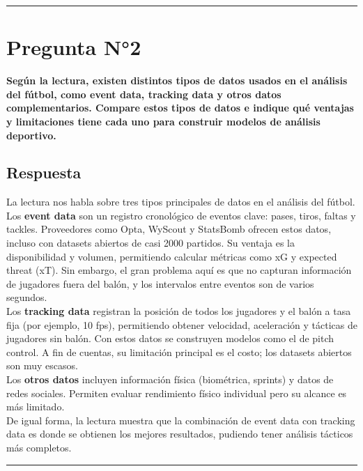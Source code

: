 \documentclass[12pt,a4paper]{article}
\begin{document}
\vspace{0.5cm}
\hrule
\vspace{0.5cm}

\section*{Pregunta N°2}
\textbf{Según la lectura, existen distintos tipos de datos usados en el análisis del fútbol, como event data, tracking data y otros datos complementarios. Compare estos tipos de datos e indique qué ventajas y limitaciones tiene cada uno para construir modelos de análisis deportivo.}

\subsection*{Respuesta}
La lectura nos habla sobre tres tipos principales de datos en el análisis del fútbol.\\

Los \textbf{event data} son un registro cronológico de eventos clave: pases, tiros, faltas y tackles. Proveedores como Opta, WyScout y StatsBomb ofrecen estos datos, incluso con datasets abiertos de casi 2000 partidos. Su ventaja es la disponibilidad y volumen, permitiendo calcular métricas como xG y expected threat (xT). Sin embargo, el gran problema aquí es que no capturan información de jugadores fuera del balón, y los intervalos entre eventos son de varios segundos.\\

Los \textbf{tracking data} registran la posición de todos los jugadores y el balón a tasa fija (por ejemplo, 10 fps), permitiendo obtener velocidad, aceleración y tácticas de jugadores sin balón. Con estos datos se construyen modelos como el de pitch control. A fin de cuentas, su limitación principal es el costo; los datasets abiertos son muy escasos.\\

Los \textbf{otros datos} incluyen información física (biométrica, sprints) y datos de redes sociales. Permiten evaluar rendimiento físico individual pero su alcance es más limitado.\\

De igual forma, la lectura muestra que la combinación de event data con tracking data es donde se obtienen los mejores resultados, pudiendo tener análisis tácticos más completos.

\vspace{0.5cm}
\hrule
\vspace{0.5cm}
\end{document}
